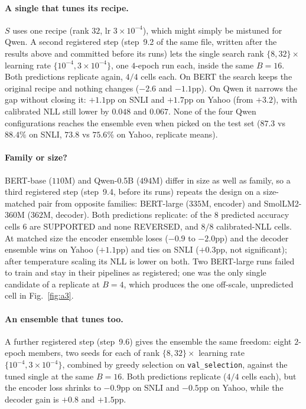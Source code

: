 \documentclass[11pt]{article}
\begin{document}
\paragraph{A single that tunes its recipe.} $S$ uses one recipe (rank $32$, lr $3{\times}10^{-4}$), which might simply be mistuned for Qwen. A second registered step (step~9.2 of the same file, written after the results above and committed before its runs) lets the single search rank $\{8,32\}\times$ learning rate $\{10^{-4},3{\times}10^{-4}\}$, one $4$-epoch run each, inside the same $B{=}16$. Both predictions replicate again, $4/4$ cells each. On BERT the search keeps the original recipe and nothing changes ($-2.6$ and $-1.1$pp). On Qwen it narrows the gap without closing it: $+1.1$pp on SNLI and $+1.7$pp on Yahoo (from $+3.2$), with calibrated NLL still lower by $0.048$ and $0.067$. None of the four Qwen configurations reaches the ensemble even when picked on the test set ($87.3$ vs $88.4\%$ on SNLI, $73.8$ vs $75.6\%$ on Yahoo, replicate means).

\paragraph{Family or size?} BERT-base ($110$M) and Qwen-0.5B ($494$M) differ in size as well as family, so a third registered step (step~9.4, before its runs) repeats the design on a size-matched pair from opposite families: BERT-large ($335$M, encoder) and SmolLM2-360M ($362$M, decoder). Both predictions replicate: of the $8$ predicted accuracy cells $6$ are SUPPORTED and none REVERSED, and $8/8$ calibrated-NLL cells. At matched size the encoder ensemble loses ($-0.9$ to $-2.0$pp) and the decoder ensemble wins on Yahoo ($+1.1$pp) and ties on SNLI ($+0.3$pp, not significant); after temperature scaling its NLL is lower on both. Two BERT-large runs failed to train and stay in their pipelines as registered; one was the only single candidate of a replicate at $B{=}4$, which produces the one off-scale, unpredicted cell in Fig.~\ref{fig:a3}.

\paragraph{An ensemble that tunes too.} A further registered step (step~9.6) gives the ensemble the same freedom: eight $2$-epoch members, two seeds for each of rank $\{8,32\}\times$ learning rate $\{10^{-4},3{\times}10^{-4}\}$, combined by greedy selection on \texttt{val\_selection}, against the tuned single at the same $B{=}16$. Both predictions replicate ($4/4$ cells each), but the encoder loss shrinks to $-0.9$pp on SNLI and $-0.5$pp on Yahoo, while the decoder gain is $+0.8$ and $+1.5$pp.
\end{document}
